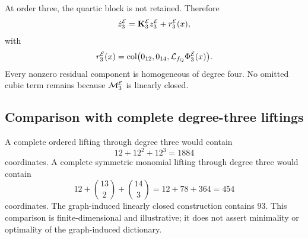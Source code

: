 At order three, the quartic block is not retained. Therefore
\[
\dot z_3^{\mathcal{E}}
=
\mathbf{K}_3^{\mathcal{E}}z_3^{\mathcal{E}}
+r_3^{\mathcal{E}}(x),
\]
with
\[
r_3^{\mathcal{E}}(x)
=
\operatorname{col}\bigl(0_{12},0_{14},\mathcal{L}_{f_{\mathrm Q}}\Phi_3^{\mathcal{E}}(x)\bigr).
\]
Every nonzero residual component is homogeneous of degree four. No omitted
cubic term remains because $\mathcal M_3^{\mathcal{E}}$ is linearly closed.

\subsection{Comparison with complete degree-three liftings}

A complete ordered lifting through degree three would contain
\[
12+12^2+12^3=1884
\]
coordinates. A complete symmetric monomial lifting through degree three would
contain
\[
12+\binom{13}{2}+\binom{14}{3}
=12+78+364
=454
\]
coordinates. The graph-induced linearly closed construction contains 93.
This comparison is finite-dimensional and illustrative; it does not assert
minimality or optimality of the graph-induced dictionary.
